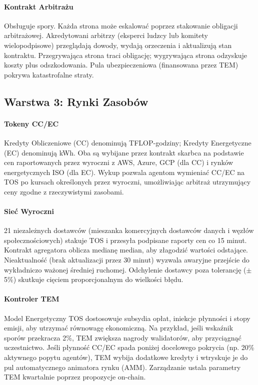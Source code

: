 \documentclass[11pt]{article}
\begin{document}
\paragraph{Kontrakt Arbitrażu} Obsługuje spory. Każda strona może eskalować poprzez stakowanie obligacji arbitrażowej. Akredytowani arbitrzy (eksperci ludzcy lub komitety wielopodpisowe) przeglądają dowody, wydają orzeczenia i aktualizują stan kontraktu. Przegrywająca strona traci obligację; wygrywająca strona odzyskuje koszty plus odszkodowania. Pula ubezpieczeniowa (finansowana przez TEM) pokrywa katastrofalne straty.

\subsection{Warstwa 3: Rynki Zasobów}
\paragraph{Tokeny CC/EC} Kredyty Obliczeniowe (CC) denominują TFLOP-godziny; Kredyty Energetyczne (EC) denominują kWh. Oba są wybijane przez kontrakt skarbca na podstawie cen raportowanych przez wyroczni z AWS, Azure, GCP (dla CC) i rynków energetycznych ISO (dla EC). Wykup pozwala agentom wymieniać CC/EC na TOS po kursach określonych przez wyroczni, umożliwiając arbitraż utrzymujący ceny zgodne z rzeczywistymi zasobami.

\paragraph{Sieć Wyroczni} 21 niezależnych dostawców (mieszanka komercyjnych dostawców danych i węzłów społecznościowych) stakuje TOS i przesyła podpisane raporty cen co 15 minut. Kontrakt agregatora oblicza medianę median, aby złagodzić wartości odstające. Nieaktualność (brak aktualizacji przez 30 minut) wyzwala awaryjne przejście do wykładniczo ważonej średniej ruchomej. Odchylenie dostawcy poza tolerancję ($\pm$5\%) skutkuje cięciem proporcjonalnym do wielkości błędu.

\paragraph{Kontroler TEM} Model Energetyczny TOS dostosowuje subsydia opłat, iniekcje płynności i stopy emisji, aby utrzymać równowagę ekonomiczną. Na przykład, jeśli wskaźnik sporów przekracza 2\%, TEM zwiększa nagrody walidatorów, aby przyciągnąć uczestnictwo. Jeśli płynność CC/EC spada poniżej docelowego pokrycia (np. 20\% aktywnego popytu agentów), TEM wybija dodatkowe kredyty i wtryskuje je do pul automatycznego animatora rynku (AMM). Zarządzanie ustala parametry TEM kwartalnie poprzez propozycje on-chain.
\end{document}
